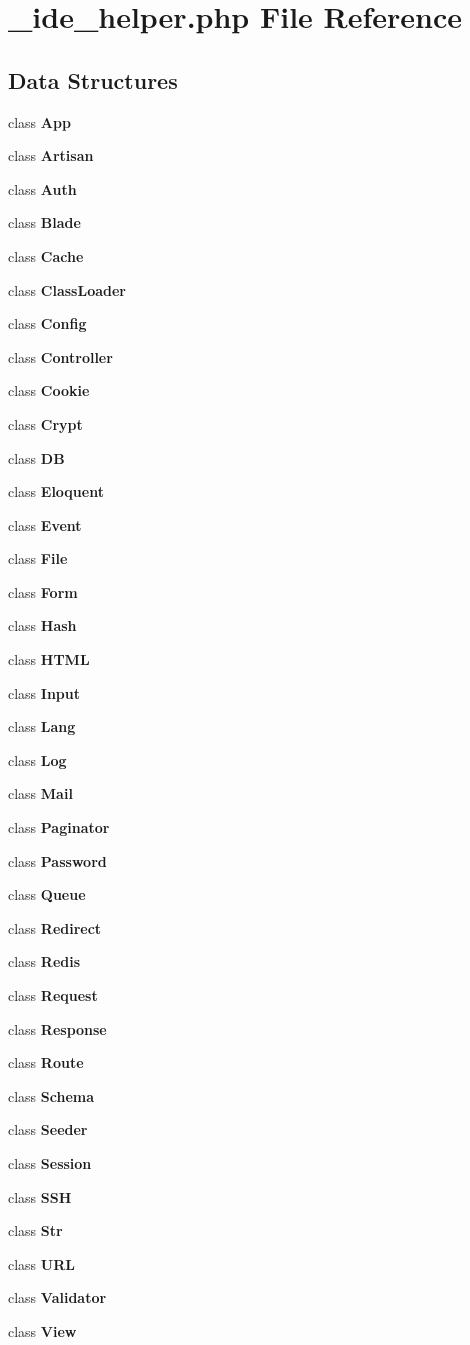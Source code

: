 \section{\+\_\+ide\+\_\+helper.\+php File Reference}
\label{__ide__helper_8php}
\subsection*{Data Structures}
\begin{DoxyCompactItemize}
\item 
class {\bf App}
\item 
class {\bf Artisan}
\item 
class {\bf Auth}
\item 
class {\bf Blade}
\item 
class {\bf Cache}
\item 
class {\bf Class\+Loader}
\item 
class {\bf Config}
\item 
class {\bf Controller}
\item 
class {\bf Cookie}
\item 
class {\bf Crypt}
\item 
class {\bf D\+B}
\item 
class {\bf Eloquent}
\item 
class {\bf Event}
\item 
class {\bf File}
\item 
class {\bf Form}
\item 
class {\bf Hash}
\item 
class {\bf H\+T\+M\+L}
\item 
class {\bf Input}
\item 
class {\bf Lang}
\item 
class {\bf Log}
\item 
class {\bf Mail}
\item 
class {\bf Paginator}
\item 
class {\bf Password}
\item 
class {\bf Queue}
\item 
class {\bf Redirect}
\item 
class {\bf Redis}
\item 
class {\bf Request}
\item 
class {\bf Response}
\item 
class {\bf Route}
\item 
class {\bf Schema}
\item 
class {\bf Seeder}
\item 
class {\bf Session}
\item 
class {\bf S\+S\+H}
\item 
class {\bf Str}
\item 
class {\bf U\+R\+L}
\item 
class {\bf Validator}
\item 
class {\bf View}
\end{DoxyCompactItemize}
